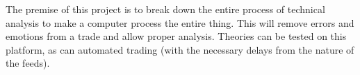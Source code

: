 The premise of this project is to break down the entire process of technical analysis to make a computer process the entire thing.
This will remove errors and emotions from a trade and allow proper analysis.
Theories can be tested on this platform, as can automated trading (with the necessary delays from the nature of the feeds).
